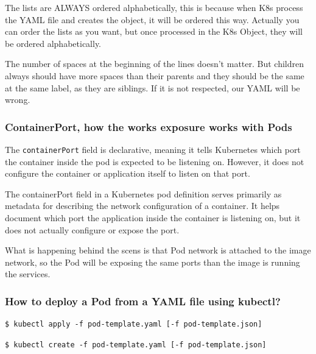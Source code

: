 \documentclass{article}
\newenvironment{blocktemplateI}[1]{%
    \tcolorbox[beamer,%
    noparskip,breakable,
    colframe=Violet,%
    colbacklower=Black,%
    title=#1]}%
    {\endtcolorbox}
\newenvironment{blocktemplateII}[1]{%
    \tcolorbox[beamer,%
    noparskip,breakable,
    colframe=Green,%
    colbacklower=LimeGreen!75!LightGreen,%
    title=#1]}%
    {\endtcolorbox}
\newenvironment{codetemplate}[1][]{%
  \mybasecolorbox[#1]
  \itshape
}{%
  \endmybasecolorbox
}
\begin{document}
\begin{blocktemplateI}{NOTE}
The lists are ALWAYS ordered alphabetically, this is because when K8s process the YAML file and creates the object, it will be ordered this way. Actually you can order the lists as you want, but once processed in the K8s Object, they will be ordered alphabetically.
\end{blocktemplateI}

\begin{blocktemplateII}{Note}
The number of spaces at the beginning of the lines doesn't matter. But children always should have more spaces than their parents and they should be the same at the same label, as they are siblings. If it is not respected, our YAML will be wrong.
\end{blocktemplateII}

\subsubsection{ContainerPort, how the works exposure works with Pods}

The \verb|containerPort| field is declarative, meaning it tells Kubernetes which port the container inside the pod is expected to be listening on. However, it does not configure the container or application itself to listen on that port.

The containerPort field in a Kubernetes pod definition serves primarily as metadata for describing the network configuration of a container. It helps document which port the application inside the container is listening on, but it does not actually configure or expose the port.

What is happening behind the scens is that Pod network is attached to the image network, so the Pod will be exposing the same ports than the image is running the services.

\subsubsection{How to deploy a Pod from a YAML file using kubectl?}

\begin{codetemplate}{}
\begin{verbatim}
$ kubectl apply -f pod-template.yaml [-f pod-template.json]
\end{verbatim}
\end{codetemplate}
\begin{codetemplate}{}
\begin{verbatim}
$ kubectl create -f pod-template.yaml [-f pod-template.json]
\end{verbatim}
\end{codetemplate}
\end{document}
